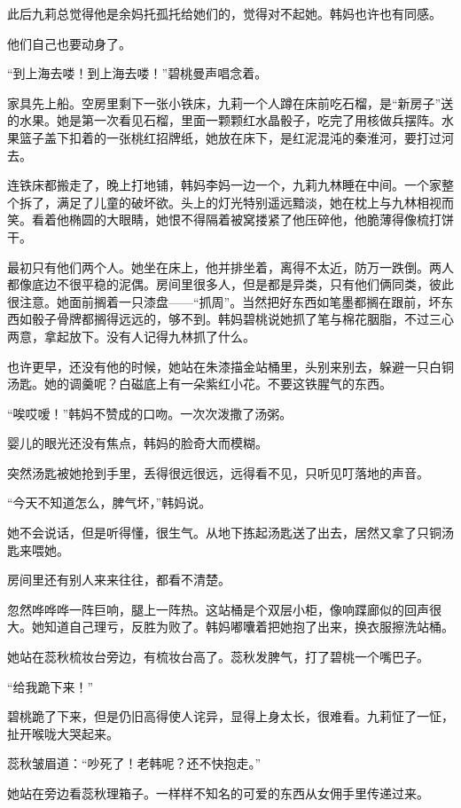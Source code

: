 \par 此后九莉总觉得他是余妈托孤托给她们的，觉得对不起她。韩妈也许也有同感。
\par 他们自己也要动身了。
\par “到上海去喽！到上海去喽！”碧桃曼声唱念着。
\par 家具先上船。空房里剩下一张小铁床，九莉一个人蹲在床前吃石榴，是“新房子”送的水果。她是第一次看见石榴，里面一颗颗红水晶骰子，吃完了用核做兵摆阵。水果篮子盖下扣着的一张桃红招牌纸，她放在床下，是红泥混沌的秦淮河，要打过河去。
\par 连铁床都搬走了，晚上打地铺，韩妈李妈一边一个，九莉九林睡在中间。一个家整个拆了，满足了儿童的破坏欲。头上的灯光特别遥远黯淡，她在枕上与九林相视而笑。看着他椭圆的大眼睛，她恨不得隔着被窝搂紧了他压碎他，他脆薄得像梳打饼干。
\par 最初只有他们两个人。她坐在床上，他并排坐着，离得不太近，防万一跌倒。两人都像底边不很平稳的泥偶。房间里很多人，但是都是异类，只有他们俩同类，彼此很注意。她面前搁着一只漆盘——“抓周”。当然把好东西如笔墨都搁在跟前，坏东西如骰子骨牌都搁得远远的，够不到。韩妈碧桃说她抓了笔与棉花胭脂，不过三心两意，拿起放下。没有人记得九林抓了什么。
\par 也许更早，还没有他的时候，她站在朱漆描金站桶里，头别来别去，躲避一只白铜汤匙。她的调羹呢？白磁底上有一朵紫红小花。不要这铁腥气的东西。
\par “唉哎嗳！”韩妈不赞成的口吻。一次次泼撒了汤粥。
\par 婴儿的眼光还没有焦点，韩妈的脸奇大而模糊。
\par 突然汤匙被她抢到手里，丢得很远很远，远得看不见，只听见叮落地的声音。
\par “今天不知道怎么，脾气坏，”韩妈说。
\par 她不会说话，但是听得懂，很生气。从地下拣起汤匙送了出去，居然又拿了只铜汤匙来喂她。
\par 房间里还有别人来来往往，都看不清楚。
\par 忽然哗哗哗一阵巨响，腿上一阵热。这站桶是个双层小柜，像响蹀廊似的回声很大。她知道自己理亏，反胜为败了。韩妈嘟囔着把她抱了出来，换衣服擦洗站桶。
\par 她站在蕊秋梳妆台旁边，有梳妆台高了。蕊秋发脾气，打了碧桃一个嘴巴子。
\par “给我跪下来！”
\par 碧桃跪了下来，但是仍旧高得使人诧异，显得上身太长，很难看。九莉怔了一怔，扯开喉咙大哭起来。
\par 蕊秋皱眉道：“吵死了！老韩呢？还不快抱走。”
\par 她站在旁边看蕊秋理箱子。一样样不知名的可爱的东西从女佣手里传递过来。
